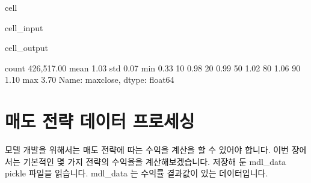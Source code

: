 \documentclass[letterpaper,10pt,english]{jupyterBook}
\begin{document}
\begin{sphinxuseclass}{cell}\begin{sphinxVerbatimInput}

\begin{sphinxuseclass}{cell_input}
\begin{sphinxVerbatim}[commandchars=\\\{\}]
  
\PYG{p}{[}\PYG{p}{]}\PYG{p}{[}    \PYG{p}{]}
\end{sphinxVerbatim}

\end{sphinxuseclass}\end{sphinxVerbatimInput}
\begin{sphinxVerbatimOutput}

\begin{sphinxuseclass}{cell_output}
\begin{sphinxVerbatim}[commandchars=\\\{\}]
count   426,517.00
mean          1.03
std           0.07
min           0.33
10\PYGZpc{}           0.98
20\PYGZpc{}           0.99
50\PYGZpc{}           1.02
80\PYGZpc{}           1.06
90\PYGZpc{}           1.10
max           3.70
Name: max\PYGZus{}close, dtype: float64
\end{sphinxVerbatim}

\end{sphinxuseclass}\end{sphinxVerbatimOutput}

\end{sphinxuseclass}

\section{ 매도 전략 데이터 프로세싱}
\label{\detokenize{chapter4/4.4.4_Data_Processing:br}}
\sphinxAtStartPar
모델 개발을 위해서는 매도 전략에 따는 수익을 계산을 할 수 있어야 합니다. 이번 장에서는 기본적인 몇 가지 전략의 수익율을 계산해보겠습니다. 저장해 둔 mdl\_data pickle 파일을 읽습니다. mdl\_data 는 수익률 결과값이 있는 데이터입니다.
\end{document}
